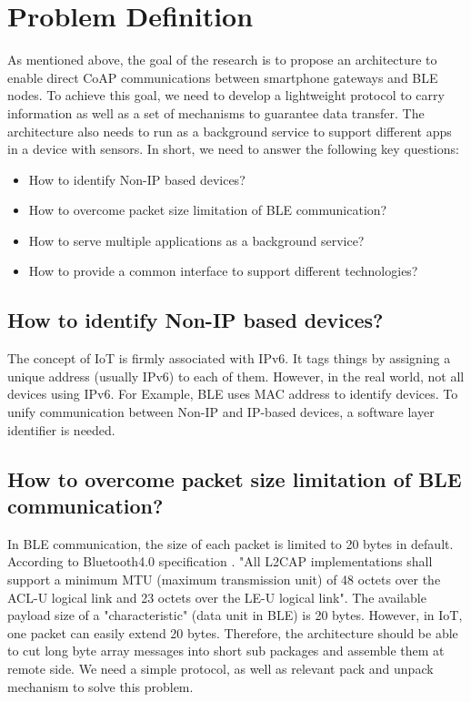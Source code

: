 \documentclass{Nan_Thesis}
\begin{document}
\chapter{Problem Definition}  
As mentioned above, the goal of the research is to propose an architecture to enable direct CoAP communications between smartphone gateways and BLE nodes. To achieve this goal, we need to develop a lightweight protocol to carry information as well as a set of mechanisms to guarantee data transfer. The architecture also needs to run as a background service to support different apps in a device with sensors. In short, we need to answer the following key questions:

\begin{itemize}
  \item How to identify Non-IP based devices?
  \item How to overcome packet size limitation of BLE communication?
  \item How to serve multiple applications as a background service?
  \item How to provide a common interface to support different technologies?
\end{itemize}

\section{How to identify Non-IP based devices?}
The concept of IoT is firmly associated with IPv6. It tags things by assigning a unique address (usually IPv6) to each of them. However, in the real world, not all devices using IPv6. For Example, BLE uses MAC address to identify devices. To unify communication between Non-IP and IP-based devices, a software layer identifier is needed. 
\section{How to overcome packet size limitation of BLE communication?}
In BLE communication, the size of each packet is limited to 20 bytes in default. According to Bluetooth4.0 specification \cite{bluetooth2010bluetooth}. "All L2CAP implementations shall support a minimum MTU (maximum transmission unit) of 48 octets over the ACL-U logical link and 23 octets over the LE-U logical link". The available payload size of a "characteristic" (data unit in BLE) is 20 bytes. However, in IoT, one packet can easily extend 20 bytes. Therefore, the architecture should be able to cut long byte array messages into short sub packages and assemble them at remote side. We need a simple protocol, as well as relevant pack and unpack mechanism to solve this problem.
\end{document}
